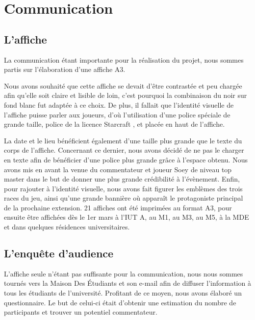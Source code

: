 \section{Communication}%
\label{sec:communication}

\subsection{L'affiche}%
\label{sub:l_affiche}

La communication étant importante pour la réalisation du projet, nous sommes partis sur l'élaboration
d'une affiche A3.

Nous avons souhaité que cette affiche se devait d’être contrastée et peu chargée afin qu’elle soit
claire et lisible de loin, c’est pourquoi la combinaison du noir sur fond blanc fut adaptée à ce choix.
De plus, il fallait que l’identité visuelle de l’affiche puisse parler aux joueurs, d’où l’utilisation
d’une police spéciale de grande taille, police de la licence \og Starcraft \fg{}, et placée en haut de l’affiche.

La date et le lieu bénéficient également d’une taille plus grande que le texte du corps de l’affiche.
Concernant ce dernier, nous avons décidé de ne pas le charger en texte afin de bénéficier d’une police
plus grande grâce à l’espace obtenu.
Nous avons mis en avant la venue du commentateur et joueur Soey de niveau \og top master \fg{} dans le but
de donner une plus grande crédibilité à l’évènement.
Enfin, pour rajouter à l’identité visuelle, nous avons fait figurer les emblèmes des trois races du jeu,
ainsi qu’une grande bannière où apparaît le protagoniste principal de la prochaine extension.
21 affiches ont été imprimées au format A3, pour ensuite être affichées dès le 1er mars à l’IUT A, au M1,
au M3, au M5, à la MDE et dans quelques résidences universitaires.

\subsection{L'enquête d'audience}%
\label{sub:l_enquete_d_audience}

L'affiche seule n'étant pas suffisante pour la communication, nous nous sommes tournés vers la
Maison Des Étudiants et son e-mail afin de diffuser l'information à tous les étudiants de l'université.
Profitant de ce moyen, nous avons élaboré un questionnaire. Le but de celui-ci était d'obtenir une estimation
du nombre de participants et trouver un potentiel commentateur.

